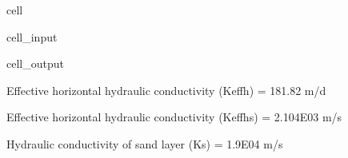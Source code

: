 \documentclass[letterpaper,10pt,english]{jupyterBook}
\begin{document}
\begin{sphinxuseclass}{cell}
\begin{sphinxVerbatimInput}
\begin{sphinxuseclass}{cell_input}
\begin{sphinxVerbatim}[commandchars=\\\{\}]
   
  
       
\end{sphinxVerbatim}

\end{sphinxuseclass}\end{sphinxVerbatimInput}
\begin{sphinxVerbatimOutput}

\begin{sphinxuseclass}{cell_output}
\begin{sphinxVerbatim}[commandchars=\\\{\}]
Effective horizontal hydraulic conductivity (Keff\PYGZus{}h) = 181.82 m/d

Effective horizontal hydraulic conductivity (Keff\PYGZus{}hs) = 2.104E\PYGZhy{}03 m/s

Hydraulic conductivity of sand layer (K\PYGZus{}s) = 1.9E\PYGZhy{}04 m/s
\end{sphinxVerbatim}

\end{sphinxuseclass}\end{sphinxVerbatimOutput}

\end{sphinxuseclass}
\end{document}

